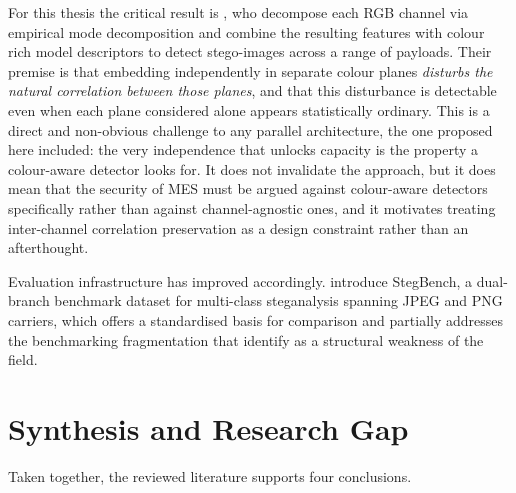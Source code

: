 For this thesis the critical result is \citet{amrutha2023rgbsteganalysis}, who decompose each RGB channel via empirical mode decomposition and combine the resulting features with colour rich model descriptors to detect stego-images across a range of payloads. Their premise is that embedding independently in separate colour planes \textit{disturbs the natural correlation between those planes}, and that this disturbance is detectable even when each plane considered alone appears statistically ordinary. This is a direct and non-obvious challenge to any parallel architecture, the one proposed here included: the very independence that unlocks capacity is the property a colour-aware detector looks for. It does not invalidate the approach, but it does mean that the security of MES must be argued against colour-aware detectors specifically rather than against channel-agnostic ones, and it motivates treating inter-channel correlation preservation as a design constraint rather than an afterthought.

Evaluation infrastructure has improved accordingly. \citet{andone2026stegbench} introduce StegBench, a dual-branch benchmark dataset for multi-class steganalysis spanning JPEG and PNG carriers, which offers a standardised basis for comparison and partially addresses the benchmarking fragmentation that \citet{janok2026survey} identify as a structural weakness of the field.

\section{Synthesis and Research Gap} \label{sec:ch2-gap}
Taken together, the reviewed literature supports four conclusions.

